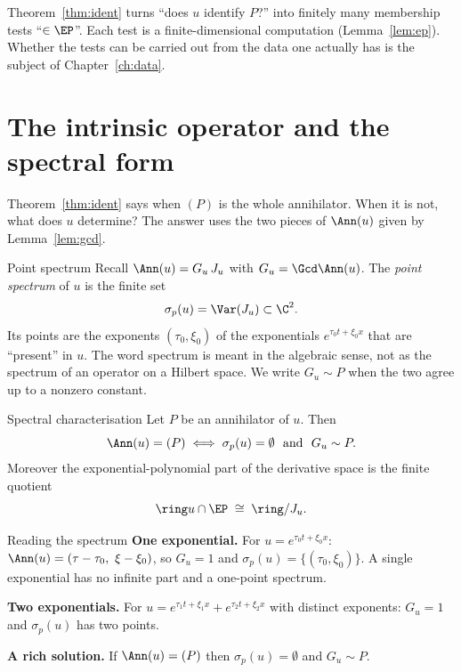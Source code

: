 \begin{takeaway}
Theorem~\ref{thm:ident} turns ``does $u$ identify $P$?'' into finitely many membership tests ``$\in\EP$''. Each test is a finite-dimensional computation (Lemma~\ref{lem:ep}). Whether the tests can be carried out from the data one actually has is the subject of Chapter~\ref{ch:data}.
\end{takeaway}

\section{The intrinsic operator and the spectral form}\label{sec:spectral}

Theorem~\ref{thm:ident} says when $(P)$ is the whole annihilator. When it is not, what does $u$ determine? The answer uses the two pieces of $\Ann(u)$ given by Lemma~\ref{lem:gcd}.

\begin{notebox}{Point spectrum}
Recall $\Ann(u)=G_u\,J_u$ with $G_u=\Gcd\Ann(u)$. The \emph{point spectrum} of $u$ is the finite set
\[
\sigma_p(u)=\Var(J_u)\subset\C^2 .
\]
Its points are the exponents $(\tau_0,\xi_0)$ of the exponentials $e^{\tau_0t+\xi_0x}$ that are ``present'' in $u$. The word spectrum is meant in the algebraic sense, not as the spectrum of an operator on a Hilbert space. We write $G_u\sim P$ when the two agree up to a nonzero constant.
\end{notebox}

\begin{theorem}{Spectral characterisation  \proved}\label{thm:spec}
Let $P$ be an annihilator of $u$. Then
\[
\Ann(u)=(P)\iff \sigma_p(u)=\emptyset\ \text{ and }\ G_u\sim P .
\]
Moreover the exponential-polynomial part of the derivative space is the finite quotient
\[
\ring u\cap\EP\;\cong\;\ring/J_u .
\]
\end{theorem}

\begin{example}{Reading the spectrum}
\textbf{One exponential.} For $u=e^{\tau_0t+\xi_0x}$: $\Ann(u)=(\tau-\tau_0,\ \xi-\xi_0)$, so $G_u=1$ and $\sigma_p(u)=\{(\tau_0,\xi_0)\}$. A single exponential has no infinite part and a one-point spectrum.

\textbf{Two exponentials.} For $u=e^{\tau_1t+\xi_1x}+e^{\tau_2t+\xi_2x}$ with distinct exponents: $G_u=1$ and $\sigma_p(u)$ has two points.

\textbf{A rich solution.} If $\Ann(u)=(P)$ then $\sigma_p(u)=\emptyset$ and $G_u\sim P$.
\end{example}


